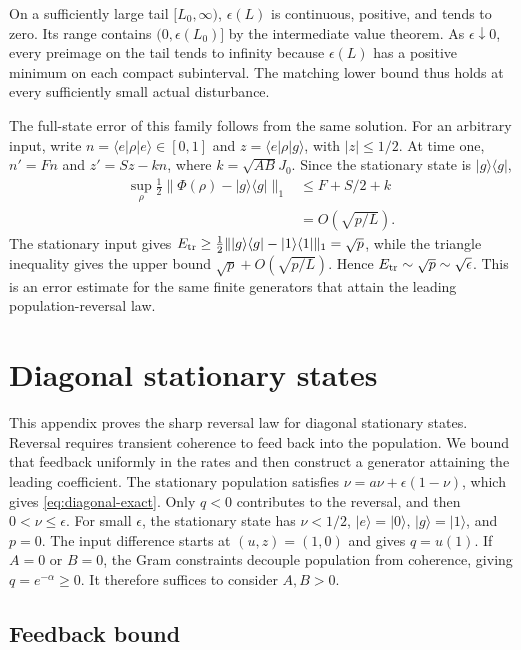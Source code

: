 \documentclass[aps,pra,reprint,amsmath,amssymb,nofootinbib,floatfix,longbibliography]{revtex4-2}
\theoremstyle{aps}
\newcommand{\eps}{\epsilon}
\newcommand{\ket}[1]{|#1\rangle}
\newcommand{\bra}[1]{\langle#1|}
\newcommand{\proj}[1]{|#1\rangle\langle#1|}
\begin{document}
On a sufficiently large tail $[L_0,\infty)$, $\eps(L)$ is continuous, positive, and tends to zero. Its range contains $(0,\eps(L_0)]$ by the intermediate value theorem. As $\eps\downarrow0$, every preimage on the tail tends to infinity because $\eps(L)$ has a positive minimum on each compact subinterval. The matching lower bound thus holds at every sufficiently small actual disturbance.

The full-state error of this family follows from the same solution. For an arbitrary input, write $n=\bra e\rho\ket e\in[0,1]$ and $z=\bra e\rho\ket g$, with $|z|\le1/2$. At time one, $n'=Fn$ and $z'=Sz-kn$, where $k=\sqrt{AB}J_0$. Since the stationary state is $\proj g$,
\begin{equation}\label{eq:pure-full-state-bound}
 \begin{split}
 \sup_\rho\tfrac12\|\Phi(\rho)-\proj g\|_1
 &\le F+S/2+k\\
 &=O\!\left(\sqrt{p/L}\right).
 \end{split}
\end{equation}
The stationary input gives $E_{\rm tr}\ge\tfrac12\|\proj g-\proj1\|_1=\sqrt p$, while the triangle inequality gives the upper bound $\sqrt p+O(\sqrt{p/L})$. Hence $E_{\rm tr}\sim\sqrt p\sim\sqrt\eps$. This is an error estimate for the same finite generators that attain the leading population-reversal law.

\section{Diagonal stationary states}\label{app:diagonal}

This appendix proves the sharp reversal law for diagonal stationary states. Reversal requires transient coherence to feed back into the population. We bound that feedback uniformly in the rates and then construct a generator attaining the leading coefficient. The stationary population satisfies
$\nu=a\nu+\eps(1-\nu)$, which gives \eqref{eq:diagonal-exact}. Only $q<0$ contributes to the reversal, and then $0<\nu\le\eps$. For small $\eps$, the stationary state has $\nu<1/2$, $\ket e=\ket0$, $\ket g=\ket1$, and $p=0$. The input difference starts at $(u,z)=(1,0)$ and gives $q=u(1)$. If $A=0$ or $B=0$, the Gram constraints decouple population from coherence, giving $q=e^{-\alpha}\ge0$. It therefore suffices to consider $A,B>0$.

\subsection{Feedback bound}
\end{document}
